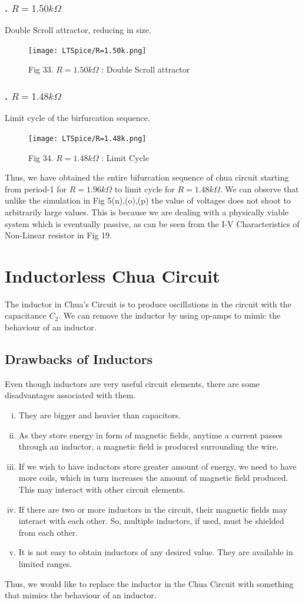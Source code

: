 \documentclass[12pt]{article}
\begin{document}
\subsubsection*{. $R=1.50k\Omega$}
Double Scroll attractor, reducing in size.
\begin{figure}[H] %
	\centering
	\texttt{[image: LTSpice/R=1.50k.png]}
	\caption{Fig 33. $R=1.50k\Omega$ : Double Scroll attractor}
\end{figure}
\subsubsection*{. $R=1.48k\Omega$}
Limit cycle of the birfurcation sequence.
\begin{figure}[H] %
	\centering
	\texttt{[image: LTSpice/R=1.48k.png]}
	\caption{Fig 34. $R=1.48k\Omega$ : Limit Cycle}
\end{figure}
Thus, we have obtained the entire bifurcation sequence of chua circuit starting from period-1 for $R=1.96k\Omega$ to limit cycle for $R=1.48k\Omega$. We can observe that unlike the simulation in Fig 5(n),(o),(p) the value of voltages does not shoot to arbitrarily large values. This is because we are dealing with a physically viable system which is eventually passive, as can be seen from the I-V Characteristics of Non-Linear resistor in Fig 19. 
\section{Inductorless Chua Circuit}
The inductor in Chua's Circuit is to produce oscillations in the circuit with the capacitance $C_2$. We can remove the inductor by using op-amps to mimic the behaviour of an inductor.
\subsection{Drawbacks of Inductors}
Even though inductors are very useful circuit elements, there are some disadvantages associated with them. 
\begin{enumerate}[i.]
	\item They are bigger and heavier than capacitors.
	\item As they store energy in form of magnetic fields, anytime a current passes through an inductor, a magnetic field is produced surrounding the wire.
	\item If we wish to have inductors store greater amount of energy, we need to have more coils, which in turn increases the amount of magnetic field produced. This may interact with other circuit elements.
	\item If there are two or more inductors in the circuit, their magnetic fields may interact with each other. So, multiple inductors, if used, must be shielded from each other. 
	\item It is not easy to obtain inductors of any desired value. They are available in limited ranges.
\end{enumerate}
Thus, we would like to replace the inductor in the Chua Circuit with something that mimics the behaviour of an inductor.
\end{document}
